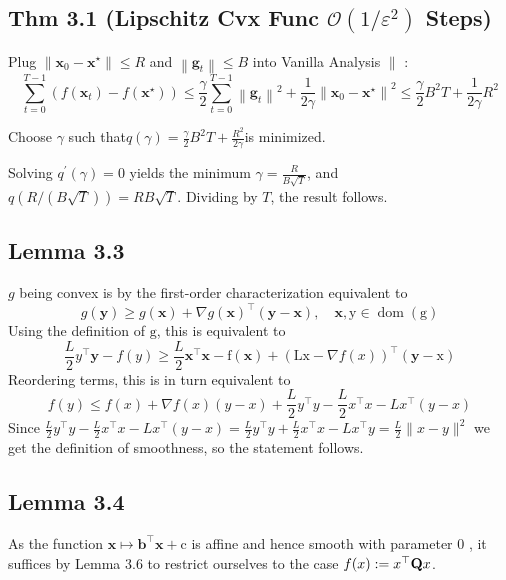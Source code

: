 \subsection*{Thm 3.1 (Lipschitz Cvx Func $\mathcal{O}\left(1 / \varepsilon^{2}\right)$ Steps)}
Plug $\left\|\mathbf{x}_{0}-\mathbf{x}^{\star}\right\| \leq R$ and $\left\|\mathbf{g}_{t}\right\| \leq B$ into Vanilla Analysis $\|$ :
$$
\sum_{t=0}^{T-1}\left(f\left(\mathbf{x}_{t}\right)-f\left(\mathbf{x}^{\star}\right)\right) \leq \frac{\gamma}{2} \sum_{t=0}^{T-1}\left\|\mathbf{g}_{t}\right\|^{2}+\frac{1}{2 \gamma}\left\|\mathbf{x}_{0}-\mathbf{x}^{\star}\right\|^{2} \leq \frac{\gamma}{2} B^{2} T+\frac{1}{2 \gamma} R^{2}
$$

Choose $\gamma$ such that$q(\gamma)=\frac{\gamma}{2} B^{2} T+\frac{R^{2}}{2 \gamma}$is minimized.

Solving $q^{\prime}(\gamma)=0$ yields the minimum $\gamma=\frac{R}{B \sqrt{T}}$, and $q(R /(B \sqrt{T}))=R B \sqrt{T}$. Dividing by $T$, the result follows.

\subsection*{Lemma 3.3}
$g$ being convex is by the first-order characterization equivalent to
$$
g(\mathbf{y}) \geq g(\mathbf{x})+\nabla g(\mathbf{x})^{\top}(\mathbf{y}-\mathbf{x}), \quad \mathbf{x}, \mathrm{y} \in \operatorname{dom}(\mathrm{g})
$$
Using the definition of $\mathrm{g}$, this is equivalent to
$$
\frac{L}{2} y^{\top} \mathbf{y}-f(y) \geq \frac{L}{2} \mathbf{x}^{\top} \mathbf{x}-\mathrm{f}(\mathbf{x})+(\mathrm{Lx}-\nabla f(x))^{\top}(\mathbf{y}-\mathrm{x})
$$
Reordering terms, this is in turn equivalent to
$$
f(y) \leq f(x)+\nabla f(x)(y-x)+\frac{L}{2} y^{\top} y-\frac{L}{2} x^{\top} x-L x^{\top}(y-x)
$$
Since
$
\frac{L}{2} y^{\top} y-\frac{L}{2} x^{\top} x-L x^{\top}(y-x)=\frac{L}{2} y^{\top} y+\frac{L}{2} x^{\top} x-L x^{\top} y=\frac{L}{2}\|x-y\|^{2}
$
we get the definition of smoothness, so the statement follows.


\subsection*{Lemma 3.4}
As the function $\mathbf{x} \mapsto \mathbf{b}^{\top} \mathbf{x}+\mathrm{c}$ is affine and hence smooth with parameter 0 , it suffices by Lemma $3.6$ to restrict ourselves to the case $f(x):=x^{\top} \boldsymbol{\mathbf{Q}} x$.

